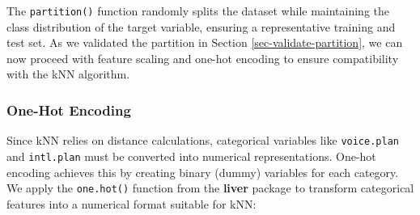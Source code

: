 \documentclass[
  11pt,
]{book}
\theoremstyle{definition}
\theoremstyle{definition}
\theoremstyle{definition}
\theoremstyle{definition}
\theoremstyle{remark}
\begin{document}
The \texttt{partition()} function randomly splits the dataset while maintaining the class distribution of the target variable, ensuring a representative training and test set. As we validated the partition in Section \ref{sec-validate-partition}, we can now proceed with feature scaling and one-hot encoding to ensure compatibility with the kNN algorithm.

\subsubsection*{One-Hot Encoding}\label{one-hot-encoding-2}


Since kNN relies on distance calculations, categorical variables like \texttt{voice.plan} and \texttt{intl.plan} must be converted into numerical representations. One-hot encoding achieves this by creating binary (dummy) variables for each category. We apply the \texttt{one.hot()} function from the \textbf{liver} package to transform categorical features into a numerical format suitable for kNN:
\end{document}
